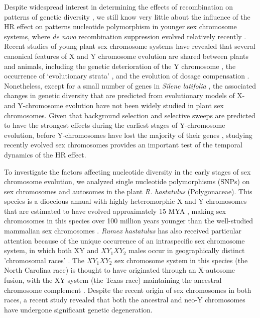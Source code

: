 \documentclass[9pt,twocolumn,twoside]{gsajnl}
\begin{document}
Despite widespread interest in determining the effects of recombination on patterns of genetic diversity \citep{ellegren2011,bachtrog2013NRG}, we still know very little about the influence of the HR effect on patterns nucleotide polymorphism in younger sex chromosome systems, where \textit{de novo} recombination suppression evolved relatively recently \citep{charlesworth2016plant}. Recent studies of young plant sex chromosome systems have revealed that several canonical features of X and Y chromosome evolution are shared between plants and animals, including the genetic deterioration of the Y chromosome \citep{bergero2015,hough2014}, the occurrence of ‘evolutionary strata’ \citep{bergero2009}, and the evolution of dosage compensation \citep{muyle2012,papadopulos2015}. Nonetheless, except for a small number of genes in \textit{Silene latifolia} \citep{filatov2001diversity,qiu2010nucleotide}, the associated changes in genetic diversity that are predicted from evolutionary models of X- and Y-chromosome evolution have not been widely studied in plant sex chromosomes. Given that background selection and selective sweeps are predicted to have the strongest effects during the earliest stages of Y-chromosome evolution, before Y-chromosomes have lost the majority of their genes \citep{bachtrog2008temporal}, studying recently evolved sex chromosomes provides an important test of the temporal dynamics of the HR effect.

To investigate the factors affecting nucleotide diversity in the early stages of sex chromosome evolution, we analyzed single nucleotide polymorphisms (SNPs) on sex chromosomes and autosomes in the plant \textit{R. hastatulus }(Polygonaceae). This species is a dioecious annual with highly heteromorphic X and Y chromosomes that are estimated to have evolved  approximately 15 MYA \citep{quesada2011,grabowska2015,navajas2005}, making sex chromosomes in this species over 100 million years younger than the well-studied mammalian sex chromosomes \citep{lahn1999,ross2005dna}. \textit{Rumex hastatulus} has also received particular attention because of the unique occurrence of an intraspecific sex chromosome system, in which both XY and $XY_{1}XY_{2}$ males occur in geographically distinct 'chromosomal races' \citep{smith1963mechanism}. The $XY_{1}XY_{2}$ sex chromosome system in this species (the North Carolina race) is thought to have originated through an X-autosome fusion, with the XY system (the Texas race) maintaining the ancestral chromosome complement \citep{smith1964evolving}. Despite the recent origin of sex chromosomes in both races, a recent study revealed that both the ancestral and neo-Y chromosomes have undergone significant genetic degeneration\citep{hough2014}.
\end{document}
